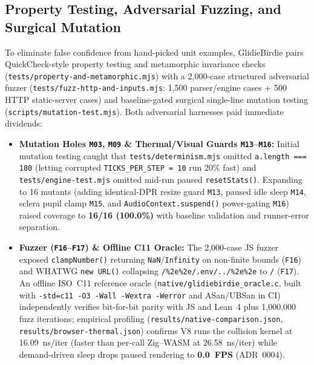 \documentclass[11pt,letterpaper]{article}
\theoremstyle{remark}
\begin{document}
\subsection{Property Testing, Adversarial Fuzzing, and Surgical Mutation}
To eliminate false confidence from hand-picked unit examples, GlidieBirdie pairs QuickCheck-style property testing \cite{claessen2000} and metamorphic invariance checks \cite{chen2018} (\texttt{tests/\allowbreak property-\allowbreak and-\allowbreak metamorphic.mjs}) with a 2,000-case structured adversarial fuzzer (\texttt{tests/\allowbreak fuzz-\allowbreak http-\allowbreak and-\allowbreak inputs.mjs}: 1,500 parser/engine cases + 500 HTTP static-server cases) and baseline-gated surgical single-line mutation testing \cite{jia2011} (\texttt{scripts/\allowbreak mutation-\allowbreak test.mjs}). Both adversarial harnesses paid immediate dividends:
\begin{itemize}[leftmargin=1.6em, itemsep=1.5pt]
  \item \textbf{Mutation Holes \texttt{M03}, \texttt{M09} \& Thermal/Visual Guards \texttt{M13}--\texttt{M16}:} Initial mutation testing caught that \texttt{tests/\allowbreak determinism.mjs} omitted \texttt{a.length === 180} (letting corrupted \texttt{TICKS\_\allowbreak PER\_\allowbreak STEP = 10} run 20\% fast) and \texttt{tests/\allowbreak engine-\allowbreak test.mjs} omitted mid-run paused \texttt{resetStats()}. Expanding to 16 mutants (adding identical-DPR resize guard \texttt{M13}, paused idle sleep \texttt{M14}, sclera pupil clamp \texttt{M15}, and \texttt{AudioContext.suspend()} power-gating \texttt{M16}) raised coverage to \textbf{16/16 (100.0\%)} with baseline validation and runner-error separation.
  \item \textbf{Fuzzer (\texttt{F16}--\texttt{F17}) \& Offline C11 Oracle:} The 2,000-case JS fuzzer exposed \texttt{clamp\allowbreak Number()} returning \texttt{NaN}/\texttt{Infinity} on non-finite bounds (\texttt{F16}) and WHATWG \texttt{new URL()} collapsing \texttt{/\%2e\%2e/\allowbreak .env/\allowbreak ../\allowbreak \%2e\%2e} to \texttt{/} (\texttt{F17}). An offline ISO~C11 reference oracle (\texttt{native/\allowbreak glidiebirdie\_\allowbreak oracle.c}, built with \texttt{-std=c11 -O3 -Wall -Wextra -Werror} and ASan/\allowbreak UBSan in CI) independently verifies bit-for-bit parity with JS and Lean~4 plus 1,000,000 fuzz iterations; empirical profiling (\texttt{results/\allowbreak native-\allowbreak comparison.json}, \texttt{results/\allowbreak browser-\allowbreak thermal.json}) confirms V8 runs the collision kernel at 16.09~ns/iter (faster than per-call Zig--WASM at 26.58~ns/iter) while demand-driven sleep drops paused rendering to \textbf{0.0~FPS} (ADR~0004).
\end{itemize}
\end{document}

